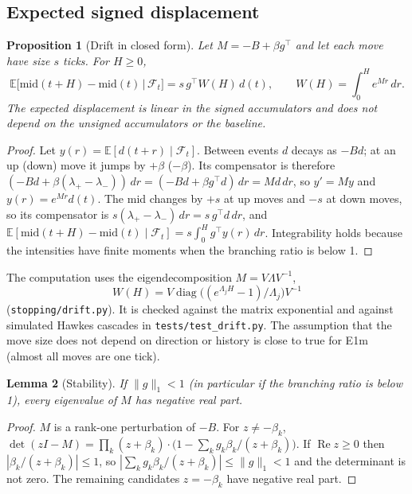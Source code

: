 \documentclass[11pt]{article}
\newtheorem{proposition}{Proposition}
\newtheorem{lemma}[proposition]{Lemma}
\theoremstyle{definition}
\theoremstyle{remark}
\newcommand{\Em}{\textsf{E1m}}
\newcommand{\file}[1]{\texttt{#1}}
\newcommand{\E}{\mathbb{E}}
\begin{document}
\subsection{Expected signed displacement}

\begin{proposition}[Drift in closed form]
\label{prop:drift}
Let $M = -B + \beta g^\top$ and let each move have size $s$ ticks. For $H \ge 0$,
\[
\E\big[\mathrm{mid}(t + H) - \mathrm{mid}(t) \,\big|\, \mathcal F_t\big] = s\, g^\top W(H)\, d(t), \qquad W(H) = \int_0^H e^{Mr}\,dr .
\]
The expected displacement is linear in the signed accumulators and does not depend on the unsigned accumulators or the baseline.
\end{proposition}

\begin{proof}
Let $y(r) = \E[d(t + r) \mid \mathcal F_t]$. Between events $d$ decays as $-Bd$; at an up (down) move it jumps by $+\beta$ ($-\beta$). Its compensator is therefore $(-Bd + \beta(\lambda_+ - \lambda_-))\,dr = (-Bd + \beta g^\top d)\,dr = Md\,dr$, so $y' = My$ and $y(r) = e^{Mr} d(t)$. The mid changes by $+s$ at up moves and $-s$ at down moves, so its compensator is $s (\lambda_+ - \lambda_-)\,dr = s\, g^\top d\,dr$, and $\E[\mathrm{mid}(t + H) - \mathrm{mid}(t) \mid \mathcal F_t] = s \int_0^H g^\top y(r)\,dr$. Integrability holds because the intensities have finite moments when the branching ratio is below 1.
\end{proof}

The computation uses the eigendecomposition $M = V \Lambda V^{-1}$,
\[
W(H) = V \operatorname{diag}\big((e^{\Lambda_{j}H} - 1)/\Lambda_{j}\big) V^{-1}
\]
(\file{stopping/drift.py}). It is checked against the matrix exponential and against simulated Hawkes cascades in \file{tests/test\_drift.py}. The assumption that the move size does not depend on direction or history is close to true for \Em{} (almost all moves are one tick).

\begin{lemma}[Stability]
\label{lem:stable}
If $\|g\|_1 < 1$ (in particular if the branching ratio is below 1), every eigenvalue of $M$ has negative real part.
\end{lemma}

\begin{proof}
$M$ is a rank-one perturbation of $-B$. For $z \ne -\beta_k$, $\det(zI - M) = \prod_k (z + \beta_k) \cdot \big(1 - \sum_k g_k \beta_k / (z + \beta_k)\big)$. If $\operatorname{Re} z \ge 0$ then $|\beta_k / (z + \beta_k)| \le 1$, so $|\sum_k g_k \beta_k/(z + \beta_k)| \le \|g\|_1 < 1$ and the determinant is not zero. The remaining candidates $z = -\beta_k$ have negative real part.
\end{proof}
\end{document}
